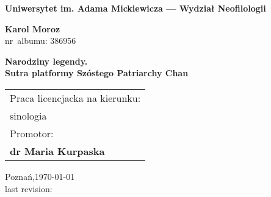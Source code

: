 \begin{titlepage}%
  \begin{center}%
    {\large \textbf{Uniwersytet im. Adama Mickiewicza --- Wydział Neofilologii}\par}
    \par
  \end{center}%
   \vspace{1cm plus 1fill}
  \begin{flushleft}%
    {{\Large\bfseries Karol Moroz}\\
    nr~albumu: 386956\par}
  \end{flushleft}%
   \vspace{8mm plus 1mm minus 2mm}
  \begin{center}%
    {\huge\textbf{Narodziny legendy.\\Sutra platformy Szóstego Patriarchy Chan}\par}
    \vspace{2cm plus 1.5fill}
    \begin{flushright}\large
      \begin{tabular}{l}
        Praca licencjacka na kierunku:\\[3pt]
        sinologia\\[3pt]
        Promotor: \\[3pt]
        \bfseries dr Maria Kurpaska
      \end{tabular}
    \end{flushright}
    \vspace{15mm plus .1fill}
    {\large Poznań,\space \today\\last revision: \par}
  \end{center}
\end{titlepage}%
